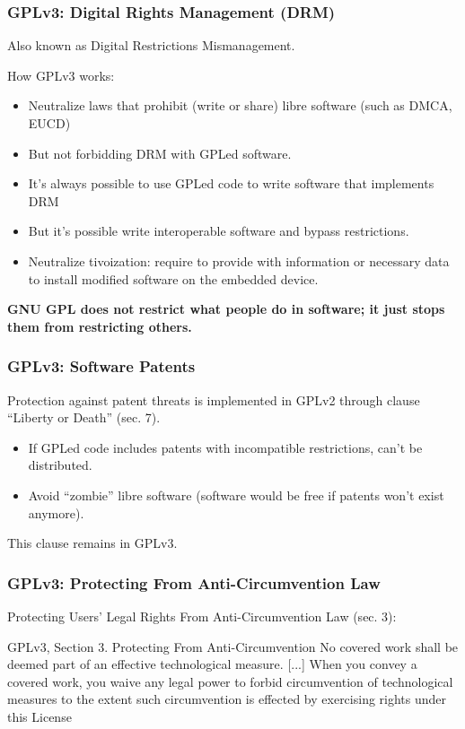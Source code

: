 
\begin{frame}
\frametitle{GPLv3: Digital Rights Management (DRM)}

Also known as Digital Restrictions Mismanagement. 

How GPLv3 works:

\begin{itemize}
\item Neutralize laws that prohibit (write or share) libre software (such as DMCA, EUCD)
\item But not forbidding DRM with GPLed software.
\item It's always possible to use GPLed code to write software that implements DRM 
\item But it's possible write interoperable software and bypass restrictions. 
\item Neutralize tivoization: require to provide with information or necessary data to install modified software on the embedded device.
\end{itemize}

\textbf{GNU GPL does not restrict what people do in software; it just stops them from restricting others.}

\end{frame}


\begin{frame}
\frametitle{GPLv3: Software Patents}
Protection against patent threats is implemented in GPLv2 through clause ``Liberty or Death'' (sec. 7).

\begin{itemize}
\item If GPLed code includes patents with incompatible restrictions, can't be distributed.
\item Avoid ``zombie'' libre software (software would be free if patents won't exist anymore).
\end{itemize}

{\centerline{This clause remains in GPLv3.}}


\end{frame}


\begin{frame}
\frametitle{GPLv3: Protecting From Anti-Circumvention Law}
Protecting Users' Legal Rights From Anti-Circumvention Law (sec. 3):

\begin{block}{GPLv3, Section 3. Protecting From Anti-Circumvention}
No covered work shall be deemed part of an effective technological measure. [...]      When you convey a covered work, you waive any legal power to forbid circumvention of
technological measures to the extent such circumvention is effected by exercising rights
under this License 
 \end{block}


\end{frame}


